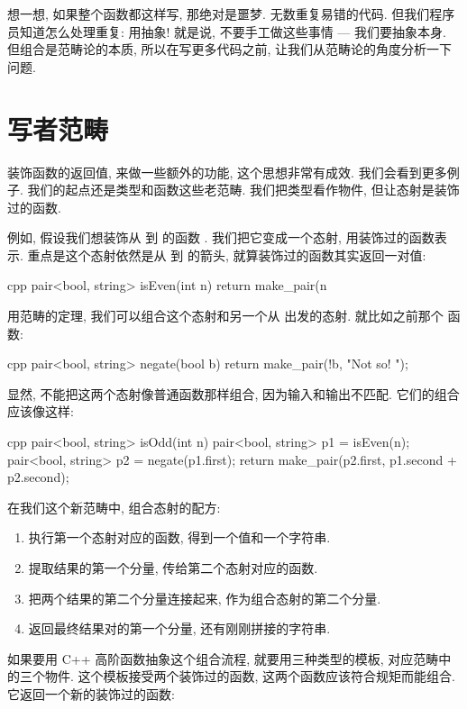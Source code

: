 想一想, 如果整个函数都这样写, 那绝对是噩梦. 无数重复易错的代码. 但我们程序员知道怎么处理重复: 用抽象!
就是说, 不要手工做这些事情 --- 我们要抽象本身. 但组合是范畴论的本质, 所以在写更多代码之前,
让我们从范畴论的角度分析一下问题.

\section{写者范畴}

装饰函数的返回值, 来做一些额外的功能, 这个思想非常有成效. 我们会看到更多例子. 我们的起点还是类型和函数这些老范畴.
我们把类型看作物件, 但让态射是装饰过的函数.

例如, 假设我们想装饰从  到  的函数 . 我们把它变成一个态射,
用装饰过的函数表示. 重点是这个态射依然是从  到  的箭头, 就算装饰过的函数其实返回一对值:

\begin{snip}{cpp}
pair<bool, string> isEven(int n) {
    return make_pair(n %
}
\end{snip}
用范畴的定理, 我们可以组合这个态射和另一个从  出发的态射. 就比如之前那个  函数:

\begin{snip}{cpp}
pair<bool, string> negate(bool b) {
    return make_pair(!b, "Not so! ");
}
\end{snip}
显然, 不能把这两个态射像普通函数那样组合, 因为输入和输出不匹配. 它们的组合应该像这样:

\begin{snip}{cpp}
pair<bool, string> isOdd(int n) {
    pair<bool, string> p1 = isEven(n);
    pair<bool, string> p2 = negate(p1.first);
    return make_pair(p2.first, p1.second + p2.second);
}
\end{snip}
在我们这个新范畴中, 组合态射的配方:

\begin{enumerate}
  \tightlist
  \item
        执行第一个态射对应的函数, 得到一个值和一个字符串.
  \item
        提取结果的第一个分量, 传给第二个态射对应的函数.
  \item
        把两个结果的第二个分量连接起来, 作为组合态射的第二个分量.
  \item
        返回最终结果对的第一个分量, 还有刚刚拼接的字符串.
\end{enumerate}

如果要用 C++ 高阶函数抽象这个组合流程, 就要用三种类型的模板, 对应范畴中的三个物件. 这个模板接受两个装饰过的函数,
这两个函数应该符合规矩而能组合. 它返回一个新的装饰过的函数:

